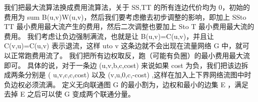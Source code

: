 \markdownRendererInterblockSeparator
{}我们把最大流算法换成费用流算法，关于 \markdownRendererDollarSign{}SS,TT\markdownRendererDollarSign{} 的所有连边代价均为 \markdownRendererDollarSign{}0\markdownRendererDollarSign{}，初始的费用为 \markdownRendererDollarSign{}\markdownRendererBackslash{}sum B(u,v)W(u,v)\markdownRendererDollarSign{}，然后我们要考虑撤去初步调整的影响，即加上 \markdownRendererDollarSign{}SS\markdownRendererBackslash{}to TT\markdownRendererDollarSign{} 最小费用最大流产生的费用，然后二次调整也要加上 \markdownRendererDollarSign{}S\markdownRendererBackslash{}to T\markdownRendererDollarSign{} 最小费用最大流的费用。\markdownRendererInterblockSeparator
{}
\markdownRendererSectionEnd \markdownRendererSectionBegin
{}\markdownRendererInterblockSeparator
{}我们考虑让负边强制满流，也就是让 \markdownRendererDollarSign{}B(u,v)=C(u,v)\markdownRendererDollarSign{}，并且让 \markdownRendererDollarSign{}C(v,u)=C(u,v)\markdownRendererDollarSign{} 表示退流，这样 \markdownRendererDollarSign{}u\markdownRendererBackslash{}to v\markdownRendererDollarSign{} 这条边就不会出现在流量网络 \markdownRendererDollarSign{}G\markdownRendererDollarSign{} 中，就可以正常跑费用流了。\markdownRendererInterblockSeparator
{}\markdownRendererInterblockSeparator
{}
\markdownRendererSectionEnd \markdownRendererSectionBegin
{}\markdownRendererInterblockSeparator
{}我们把所有边权取反，跑（可能有负圈）的最小费用最大流即可。\markdownRendererParagraphSeparator
{}具体的说，对于一条边\markdownRendererDollarSign{} (u,v,b,c,cost) \markdownRendererDollarSign{}来说如果\markdownRendererDollarSign{} cost \markdownRendererDollarSign{}为负，我们把该边拆成两条分别是\markdownRendererDollarSign{} (\markdownRendererSoftLineBreak
{}u,v,c,c,cost) \markdownRendererDollarSign{}以及\markdownRendererDollarSign{} (v,u,0,c,-cost) \markdownRendererDollarSign{},这样在加入上下界网络流图中时负边权必须流满。\markdownRendererInterblockSeparator
{}
\markdownRendererSectionEnd 
\markdownRendererSectionEnd \markdownRendererSectionBegin
{}\markdownRendererInterblockSeparator
{}定义无向联通图\markdownRendererDollarSign{} G \markdownRendererDollarSign{}的最小割为，边权和最小的边集\markdownRendererDollarSign{} E \markdownRendererDollarSign{}，满足去掉\markdownRendererDollarSign{} E \markdownRendererDollarSign{}之后可以使\markdownRendererDollarSign{} G \markdownRendererDollarSign{}变成两个联通分量。\markdownRendererInterblockSeparator
